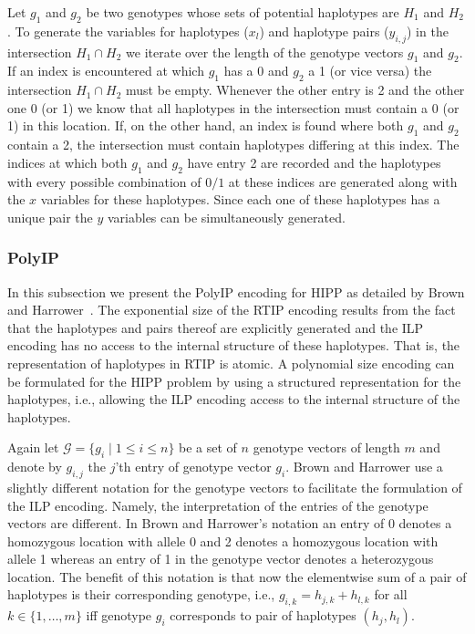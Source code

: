 \documentclass[12pt,a4paper]{article}
\begin{document}
Let $g_1$ and $g_2$ be two genotypes whose sets of potential haplotypes are $H_1$ and $H_2$.
To generate the variables for haplotypes ($x_l$) and haplotype pairs ($y_{i,j}$) in the intersection $H_1\cap H_2$ we iterate over the length of the genotype vectors $g_1$ and $g_2$.
If an index is encountered at which $g_1$ has a 0 and $g_2$ a 1 (or vice versa) the intersection $H_1\cap H_2$ must be empty.
Whenever the other entry is 2 and the other one 0 (or 1) we know that all haplotypes in the intersection must contain a 0 (or 1) in this location.
If, on the other hand, an index is found where both $g_1$ and $g_2$ contain a 2, the intersection must contain haplotypes differing at this index.
The indices at which both $g_1$ and $g_2$ have entry 2 are recorded and the haplotypes with every possible combination of $0/1$ at these indices are generated along with the $x$ variables for these haplotypes.
Since each one of these haplotypes has a unique pair the $y$ variables can be simultaneously generated.

\subsubsection{PolyIP}
In this subsection we present the PolyIP encoding for HIPP as detailed by Brown and Harrower~\cite{DBLP:journals/tcbb/BrownH06}.
The exponential size of the RTIP encoding results from the fact that the haplotypes and pairs thereof are explicitly generated and the ILP encoding has no access to the internal structure of these haplotypes.
That is, the representation of haplotypes in RTIP is atomic.
A polynomial size encoding can be formulated for the HIPP problem by using a structured representation for the haplotypes, i.e., allowing the ILP encoding access to the internal structure of the haplotypes.

Again let $\mathcal{G}=\{g_i\mid 1\leq i \leq n\}$ be a set of $n$ genotype vectors of length $m$ and denote by $g_{i,j}$ the $j$'th entry of genotype vector $g_i$.
Brown and Harrower use a slightly different notation for the genotype vectors to facilitate the formulation of the ILP encoding.
Namely, the interpretation of the entries of the genotype vectors are different.
In Brown and Harrower's notation an entry of 0 denotes a homozygous location with allele 0 and 2 denotes a homozygous location with allele 1 whereas 
an entry of 1 in the genotype vector denotes a heterozygous location.
The benefit of this notation is that now the elementwise sum of a pair of haplotypes is their corresponding genotype, i.e., $g_{i,k} = h_{j, k} + h_{l, k}$ for all $k\in\{1,\dots ,m\}$ iff genotype $g_i$ corresponds to pair of haplotypes $(h_{j}, h_{l})$.
\end{document}
